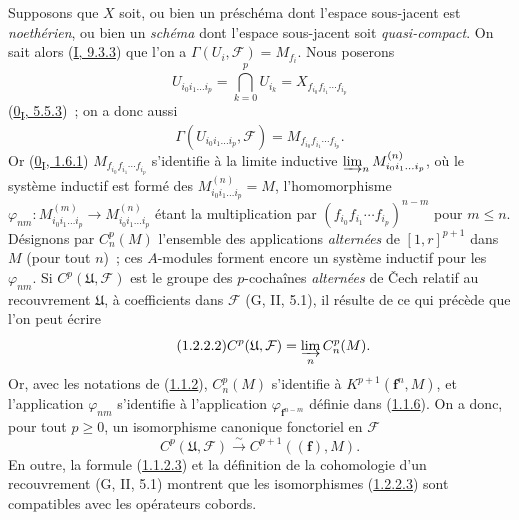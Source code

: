 \begin{env}[1.2.2]
\label{III.1.2.2-fr}
Supposons que $X$ soit, ou bien un préschéma dont l'espace sous-jacent est
\emph{noethérien}, ou bien un \emph{schéma} dont l'espace sous-jacent soit
\emph{quasi-compact}. On sait alors (\hyperref[I.9.3.3-fr]{I, 9.3.3}) que
l'on a $\Gamma(U_i,\mathcal F)=M_{f_i}$. Nous poserons
\[
U_{i_0i_1\ldots i_p}=\bigcap_{k=0}^p U_{i_k}
=X_{f_{i_0}f_{i_1}\cdots f_{i_p}}
\]
(\hyperref[0.5.5.3-fr]{0\textsubscript{I}, 5.5.3})~; on a donc aussi
\begin{equation}
\label{III.1.2.2.1-fr}
\tag{1.2.2.1}
\Gamma(U_{i_0i_1\ldots i_p},\mathcal F)=M_{f_{i_0}f_{i_1}\cdots f_{i_p}}.
\end{equation}
Or (\hyperref[0.1.6.1-fr]{0\textsubscript{I}, 1.6.1})
$M_{f_{i_0}f_{i_1}\cdots f_{i_p}}$ s'identifie à la limite inductive
$\varinjlim_n M_{i_0i_1\ldots i_p}^{(n)}$, où le système inductif est formé
des $M_{i_0i_1\ldots i_p}^{(n)}=M$, l'homomorphisme
$\varphi_{nm}:M_{i_0i_1\ldots i_p}^{(m)}\to
M_{i_0i_1\ldots i_p}^{(n)}$ étant la multiplication par
$(f_{i_0}f_{i_1}\cdots f_{i_p})^{n-m}$ pour $m\leq n$. Désignons par
$C_n^p(M)$ l'ensemble des applications \emph{alternées} de $[1,r]^{p+1}$
dans $M$ (pour tout $n$)~; ces $A$-modules forment encore un système inductif
pour les $\varphi_{nm}$. Si $C^p(\mathfrak U,\mathcal F)$ est le groupe des
$p$-cochaînes \emph{alternées} de Čech relatif au recouvrement $\mathfrak U$,
à coefficients dans $\mathcal F$ (G, II, 5.1), il résulte de ce qui précède
que l'on peut écrire
\begin{equation}
\label{III.1.2.2.2-fr}
\tag{1.2.2.2}
C^p(\mathfrak U,\mathcal F)=\varinjlim_n C_n^p(M).
\end{equation}
Or, avec les notations de (\hyperref[III.1.1.2-fr]{1.1.2}), $C_n^p(M)$
s'identifie à $K^{p+1}(\mathbf f^n,M)$, et l'application $\varphi_{nm}$
s'identifie à l'application $\varphi_{\mathbf f^{n-m}}$ définie dans
(\hyperref[III.1.1.6-fr]{1.1.6}). On a donc, pour tout $p\geq0$, un
isomorphisme canonique fonctoriel en $\mathcal F$
\begin{equation}
\label{III.1.2.2.3-fr}
\tag{1.2.2.3}
C^p(\mathfrak U,\mathcal F)\xrightarrow{\sim}C^{p+1}((\mathbf f),M).
\end{equation}
En outre, la formule (\hyperref[III.1.1.2.3-fr]{1.1.2.3}) et la définition de
la cohomologie d'un recouvrement (G, II, 5.1) montrent que les isomorphismes
(\hyperref[III.1.2.2.3-fr]{1.2.2.3}) sont compatibles avec les opérateurs
cobords.
\end{env}

